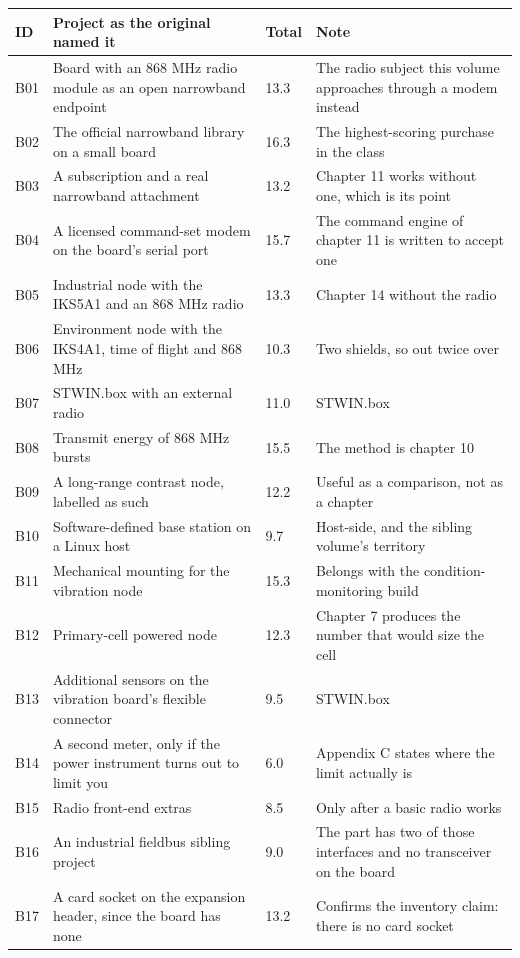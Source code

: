 \begin{table}[H]\centering\small
\begin{tabular}{p{9mm}p{82mm}p{11mm}p{43mm}}
\toprule
ID & Project as the original named it & Total & Note \\
\midrule
B01 & Board with an 868 MHz radio module as an open narrowband endpoint & 13.3 & The radio subject this volume approaches through a modem instead \\
B02 & The official narrowband library on a small board & 16.3 & The highest-scoring purchase in the class \\
B03 & A subscription and a real narrowband attachment & 13.2 & Chapter 11 works without one, which is its point \\
B04 & A licensed command-set modem on the board's serial port & 15.7 & The command engine of chapter 11 is written to accept one \\
B05 & Industrial node with the IKS5A1 and an 868 MHz radio & 13.3 & Chapter 14 without the radio \\
B06 & Environment node with the IKS4A1, time of flight and 868 MHz & 10.3 & Two shields, so out twice over \\
B07 & STWIN.box with an external radio & 11.0 & STWIN.box \\
B08 & Transmit energy of 868 MHz bursts & 15.5 & The method is chapter 10 \\
B09 & A long-range contrast node, labelled as such & 12.2 & Useful as a comparison, not as a chapter \\
B10 & Software-defined base station on a Linux host & 9.7 & Host-side, and the sibling volume's territory \\
B11 & Mechanical mounting for the vibration node & 15.3 & Belongs with the condition-monitoring build \\
B12 & Primary-cell powered node & 12.3 & Chapter 7 produces the number that would size the cell \\
B13 & Additional sensors on the vibration board's flexible connector & 9.5 & STWIN.box \\
B14 & A second meter, only if the power instrument turns out to limit you & 6.0 & Appendix C states where the limit actually is \\
B15 & Radio front-end extras & 8.5 & Only after a basic radio works \\
B16 & An industrial fieldbus sibling project & 9.0 & The part has two of those interfaces and no transceiver on the board \\
B17 & A card socket on the expansion header, since the board has none & 13.2 & Confirms the inventory claim: there is no card socket \\

\end{tabular}
\end{table}
